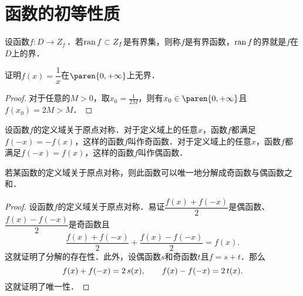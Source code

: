 \section{函数的初等性质\label{sec:funcprops}}

\begin{definition*}
  设函数\(f\colon D \to Z_f\)\,．若\(\operatorname{ran} f \subset Z_f\)是有界集，则称\(f\)是有界函数，\(\operatorname{ran} f\)的界就是\(f\)在\(D\)上的界．
\end{definition*}

\begin{example*}
  证明\(f(x) = \dfrac1x\)在\(\paren{0,+\infty}\)上无界．

  \begin{proof}
    对于任意的\(M > 0\)，取\(x_0 = \frac1{2M}\)，则有\(x_0 \in \paren{0,+\infty}\)且\(f(x_0) = 2M > M\)．
  \end{proof}
\end{example*}

\begin{definition*}
  设函数\(f\)的定义域关于原点对称．对于定义域上的任意\(x\)，函数\(f\)都满足\(f(-x) = -f(x)\)，这样的函数\(f\)叫作奇函数．对于定义域上的任意\(x\)，函数\(f\)都满足\(f(-x) = f(x)\)，这样的函数\(f\)叫作偶函数．
\end{definition*}

\hypertarget{T:evenodd}{}
\begin{theorem*}
  若某函数的定义域关于原点对称，则此函数可以唯一地分解成奇函数与偶函数之和．

  \begin{proof}
    设函数\(f\)的定义域关于原点对称．易证\(\dfrac{f(x)+f(-x)}{2}\)是偶函数、\(\dfrac{f(x)-f(-x)}{2}\)是奇函数且
    \[
      \frac{f(x)+f(-x)}{2} + \frac{f(x)-f(-x)}{2} = f(x).
    \]
    这就证明了分解的存在性．此外，设偶函数\(s\)和奇函数\(t\)且\(f = s + t\)．那么
    \[
      f(x) + f(-x) = 2\mathop{\relax\kern0pt s}\nolimits(x),
      \qquad
      f(x) - f(-x) = 2\mathop{\relax\kern0pt t}\nolimits(x).
    \]
    这就证明了唯一性．
  \end{proof}
\end{theorem*}

